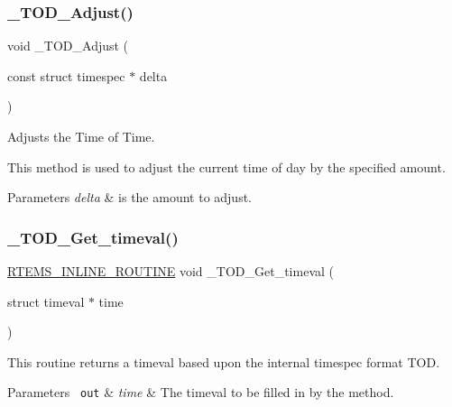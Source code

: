 \subsubsection{\texorpdfstring{\_TOD\_Adjust()}{\_TOD\_Adjust()}}
{\footnotesize\ttfamily void \+\_\+\+T\+O\+D\+\_\+\+Adjust (\begin{DoxyParamCaption}\item[{const struct timespec $\ast$}]{delta }\end{DoxyParamCaption})}



Adjusts the Time of Time. 

This method is used to adjust the current time of day by the specified amount.


\begin{DoxyParams}{Parameters}
{\em delta} & is the amount to adjust. \\
\hline
\end{DoxyParams}
\mbox{\label{group__RTEMSScoreTOD_ga607a5281a16201ae5175c1146d7aab91}} 
\subsubsection{\texorpdfstring{\_TOD\_Get\_timeval()}{\_TOD\_Get\_timeval()}}
{\footnotesize\ttfamily \mbox{\hyperlink{group__RTEMSScoreBaseDefs_gac216239df231d5dbd15e3520b0b9313f}{R\+T\+E\+M\+S\+\_\+\+I\+N\+L\+I\+N\+E\+\_\+\+R\+O\+U\+T\+I\+NE}} void \+\_\+\+T\+O\+D\+\_\+\+Get\+\_\+timeval (\begin{DoxyParamCaption}\item[{struct timeval $\ast$}]{time }\end{DoxyParamCaption})}



This routine returns a timeval based upon the internal timespec format T\+OD. 


\begin{DoxyParams}[1]{Parameters}
\mbox{\texttt{ out}}  & {\em time} & The timeval to be filled in by the method. \\
\hline
\end{DoxyParams}
\mbox{\label{group__RTEMSScoreTOD_gad7357f287de1aec092ef824c185229b9}} 
